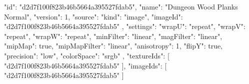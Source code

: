{
  "id": "d2d7f100f823b46b5664a395527fdab5",
  "name": "Dungeon Wood Planks Normal",
  "version": 1,
  "source": {
    "kind": "image",
    "imageId": "d2d7f100f823b46b5664a395527fdab5"
  },
  "settings": {
    "wrapU": "repeat",
    "wrapV": "repeat",
    "wrapW": "repeat",
    "minFilter": "linear",
    "magFilter": "linear",
    "mipMap": true,
    "mipMapFilter": "linear",
    "anisotropy": 1,
    "flipY": true,
    "precision": "low",
    "colorSpace": "srgb"
  },
  "textureIds": [
    "d2d7f100f823b46b5664a395527fdab5"
  ],
  "imageIds": [
    "d2d7f100f823b46b5664a395527fdab5"
  ]
}
